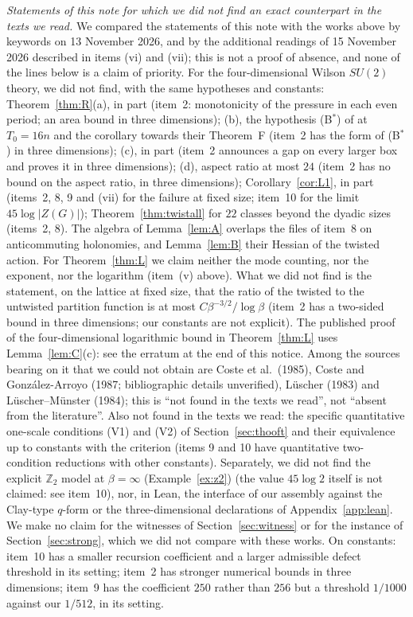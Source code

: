 \documentclass[11pt,a4paper]{article}
\theoremstyle{plain}
\theoremstyle{definition}
\theoremstyle{remark}
\numberwithin{equation}{section}
\begin{document}
\par\medskip\noindent\textit{Statements of this note for which we did not find an exact counterpart in the texts we read.} We compared the statements of this note with the works above by keywords on 13 November 2026, and by the additional readings of 15 November 2026 described in items (vi) and (vii); this is not a proof of absence, and none of the lines below is a claim of priority. For the four-dimensional Wilson $SU(2)$ theory, we did not find, with the same hypotheses and constants: Theorem~\ref{thm:R}(a), in part (item~2: monotonicity of the pressure in each even period; an area bound in three dimensions); (b), the hypothesis (B$^*$) of \cite{BB26v5} at $T_0=16n$ and the corollary towards their Theorem~F (item~2 has the form of (B$^*$) in three dimensions);
(c), in part (item~2 announces a gap on every larger box and proves it in three dimensions); (d), aspect ratio at most $24$ (item~2 has no bound on the aspect ratio, in three dimensions); Corollary~\ref{cor:L1}, in part (items~2, 8, 9 and (vii) for the failure at fixed size; item~10 for the limit $45\log|Z(G)|$); Theorem~\ref{thm:twistall} for $22$ classes beyond the dyadic sizes (items~2, 8). The algebra of Lemma~\ref{lem:A} overlaps the files of item~8 on anticommuting holonomies, and Lemma~\ref{lem:B} their Hessian of the twisted action. For Theorem~\ref{thm:L} we claim neither the mode counting, nor the exponent, nor the logarithm (item~(v) above). What we did not find is the statement, on the lattice at fixed size, that the ratio of the twisted to the untwisted partition function is at most $C\beta^{-3/2}/\log\beta$ (item~2 has a two-sided bound in three dimensions; our constants are not explicit). The published proof of the four-dimensional logarithmic bound in Theorem~\ref{thm:L} uses Lemma~\ref{lem:C}(c): see the erratum at the end of this notice. Among the sources bearing on it that we could not obtain are Coste et al.\ (1985), Coste and Gonz\'alez-Arroyo (1987; bibliographic details unverified), L\"uscher (1983) and L\"uscher--M\"unster (1984); this is ``not found in the texts we read'', not ``absent from the literature''. Also not found in the texts we read: the specific quantitative one-scale conditions (V1) and (V2) of Section~\ref{sec:thooft} and their equivalence up to constants with the criterion (items 9 and 10 have quantitative two-condition reductions with other constants). Separately, we did not find the explicit $\mathbb Z_2$ model at $\beta=\infty$ (Example~\ref{ex:z2}) (the value $45\log2$ itself is not claimed: see item~10), nor, in Lean, the interface of our assembly against the Clay-type $q$-form or the three-dimensional declarations of Appendix~\ref{app:lean}.
We make no claim for the witnesses of Section~\ref{sec:witness} or for the instance of Section~\ref{sec:strong}, which we did not compare with these works. On constants: item~10 has a smaller recursion coefficient and a larger admissible defect threshold in its setting; item~2 has stronger numerical bounds in three dimensions; item~9 has the coefficient $250$ rather than $256$ but a threshold $1/1000$ against our $1/512$, in its setting.
\end{document}
